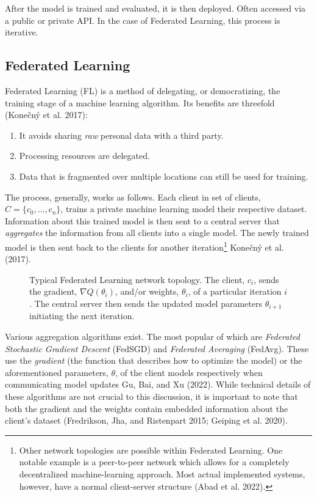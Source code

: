 \documentclass[
  compsoc]{IEEEtran}
\providecommand{\tightlist}{%
  \setlength{\itemsep}{0pt}\setlength{\parskip}{0pt}}
\begin{document}
After the model is trained and evaluated, it is then deployed. Often
accessed via a public or private API. In the case of Federated Learning,
this process is iterative.

\hypertarget{federated-learning}{%
\subsection{Federated Learning}\label{federated-learning}}

Federated Learning (FL) is a method of delegating, or democratizing, the
training stage of a machine learning algorithm. Its benefits are
threefold (Konečný et al. 2017):

\begin{enumerate}
\def\labelenumi{\arabic{enumi}.}
\tightlist
\item
  It avoids sharing \emph{raw} personal data with a third party.
\item
  Processing resources are delegated.
\item
  Data that is fragmented over multiple locations can still be used for
  training.
\end{enumerate}

The process, generally, works as follows. Each client in set of clients,
\(C=\{c_0, \ldots, c_n\}\), trains a private machine learning model
their respective dataset. Information about this trained model is then
sent to a central server that \emph{aggregates} the information from all
clients into a single model. The newly trained model is then sent back
to the clients for another iteration\footnote{Other network topologies
  are possible within Federated Learning. One notable example is a
  peer-to-peer network which allows for a completely decentralized
  machine-learning approach. Most actual implemented systems, however,
  have a normal client-server structure (Abad et al. 2022).} Konečný et
al. (2017).

\begin{figure}
\centering
\def\svgscale{0.6}

\caption{Typical Federated Learning network topology. The client,
\(c_i\), sends the gradient, \(\nabla Q(\theta_i)\), and/or weights,
\(\theta_i\), of a particular iteration \(i\). The central server then
sends the updated model parameters \(\theta_{i+1}\) initiating the next
iteration.}
\end{figure}

Various aggregation algorithms exist. The most popular of which are
\emph{Federated Stochastic Gradient Descent} (FedSGD) and
\emph{Federated Averaging} (FedAvg). These use the \emph{gradient} (the
function that describes how to optimize the model) or the aforementioned
parameters, \(\theta\), of the client models respectively when
communicating model updates Gu, Bai, and Xu (2022). While technical
details of these algorithms are not crucial to this discussion, it is
important to note that both the gradient and the weights contain
embedded information about the client's dataset (Fredrikson, Jha, and
Ristenpart 2015; Geiping et al. 2020).
\end{document}
